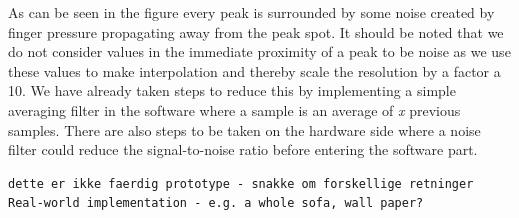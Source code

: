 As can be seen in the figure every peak is surrounded by some noise created by finger pressure propagating away from the peak spot.
It should be noted that we do not consider values in the immediate proximity of a peak to be noise as we use these values to make interpolation and thereby scale the resolution by a factor a 10.
We have already taken steps to reduce this by implementing a simple averaging filter in the software 
where a sample is an average of \emph{x} previous samples.
There are also steps to be taken on the hardware side where a noise filter could reduce the signal-to-noise ratio before entering the software part.


\begin{verbatim}
dette er ikke faerdig prototype - snakke om forskellige retninger
Real-world implementation - e.g. a whole sofa, wall paper?
\end{verbatim}

